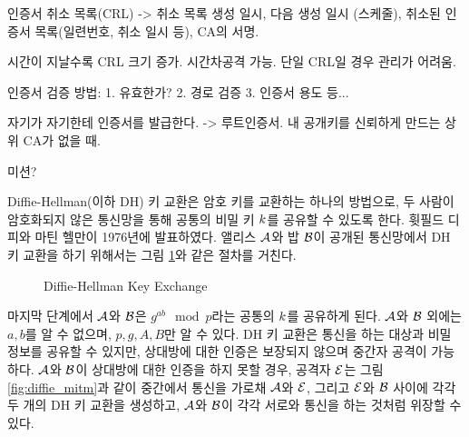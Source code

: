 인증서 취소 목록(CRL)
-> 취소 목록 생성 일시, 다음 생성 일시 (스케줄), 취소된 인증서 목록(일련번호, 취소 일시 등), CA의 서명.

시간이 지날수록 CRL 크기 증가.
시간차공격 가능.
단일 CRL일 경우 관리가 어려움.

인증서 검증 방법: 1. 유효한가? 2. 경로 검증 3. 인증서 용도 등...

자기가 자기한테 인증서를 발급한다. -> 루트인증서. 내 공개키를 신뢰하게 만드는 상위 CA가 없을 때.

미션?

Diffie-Hellman(이하 DH) 키 교환은 암호 키를 교환하는 하나의
방법으로, 두 사람이 암호화되지 않은 통신망을 통해 공통의 비밀 키 $k$를 공유할 수
있도록 한다. 휫필드 디피와 마틴 헬만이 1976년에 발표하였다. 앨리스 $\mathcal{A}$와 밥
$\mathcal{B}$이 공개된 통신망에서 DH 키 교환을 하기 위해서는 그림
\ref{fig:diffie}와 같은 절차를 거친다.

\begin{figure}[ht]
  \centering
  \caption{Diffie-Hellman Key Exchange}
  \label{fig:diffie}
\end{figure}

마지막 단계에서 $\mathcal{A}$와 $\mathcal{B}$은 $g^{ab} \mod p$라는 공통의 $k$를
공유하게 된다. $\mathcal{A}$와 $\mathcal{B}$ 외에는 $a, b$를 알 수 없으며, $p, g, A, B$만 알
수 있다. DH 키 교환은 통신을 하는 대상과 비밀 정보를 공유할 수 있지만,
상대방에 대한 인증은 보장되지 않으며 중간자 공격이 가능하다. $\mathcal{A}$와 $\mathcal{B}$이
상대방에 대한 인증을 하지 못할 경우, 공격자 $\mathcal{E}$는 그림 \ref{fig:diffie_mitm}과 같이
중간에서 통신을 가로채 $\mathcal{A}$와 $\mathcal{E}$, 그리고 $\mathcal{E}$와 $\mathcal{B}$ 사이에 각각 두 개의
DH 키 교환을 생성하고, $\mathcal{A}$와 $\mathcal{B}$이 각각 서로와 통신을 하는 것처럼
위장할 수 있다.

